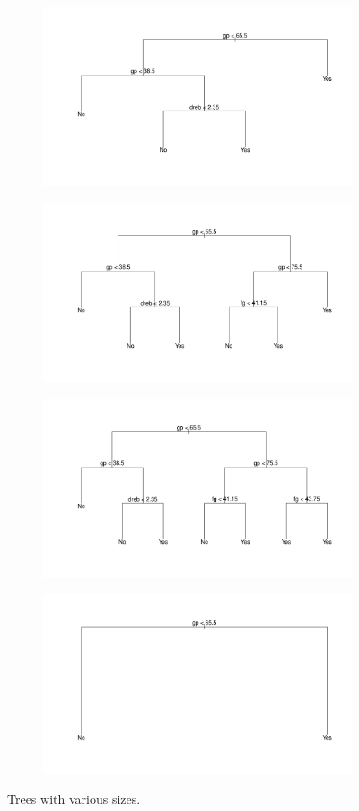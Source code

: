 \begin{figure}[H]
	\centering
	\begin{subfigure}{.6\textwidth}
		\centering
		\includegraphics[width=0.5\linewidth]{ImageFiles/Classification/Trees/tree_size_4.pdf}
		\caption{}
		\label{fig:tree_size_4}
	\end{subfigure}%
	\begin{subfigure}{.6\textwidth}
		\centering
		\includegraphics[width=0.6\linewidth]{ImageFiles/Classification/Trees/tree_size_6.pdf}
		\caption{}
		\label{fig:tree_size_6}
	\end{subfigure}
	\begin{subfigure}{.6\textwidth}
		\centering
		\includegraphics[width=0.5\linewidth]{ImageFiles/Classification/Trees/tree_size_7.pdf}
		\caption{}
		\label{fig:tree_size_7}
	\end{subfigure}%
	\begin{subfigure}{.6\textwidth}
		\centering
		\includegraphics[width=0.6\linewidth]{ImageFiles/Classification/Trees/tree_size_2.pdf}
		\caption{}
		\label{fig:tree_size_2}
	\end{subfigure}
	\caption{Trees with various sizes.}
	\label{fig:trees_size}
\end{figure}

